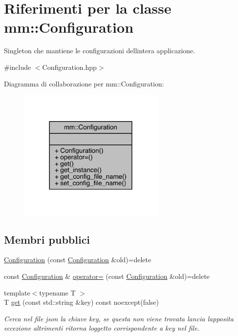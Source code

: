 \hypertarget{classmm_1_1_configuration}{}\section{Riferimenti per la classe mm\+:\+:Configuration}
\label{classmm_1_1_configuration}


Singleton che mantiene le configurazioni dell\textquotesingle{}intera applicazione.  




{\ttfamily \#include $<$Configuration.\+hpp$>$}



Diagramma di collaborazione per mm\+:\+:Configuration\+:\nopagebreak
\begin{figure}[H]
\begin{center}
\leavevmode
\includegraphics[width=206pt]{dc/d7c/classmm_1_1_configuration__coll__graph}
\end{center}
\end{figure}
\subsection*{Membri pubblici}
\begin{DoxyCompactItemize}
\item 
\hyperlink{classmm_1_1_configuration_a71e5c0e1ad7d82d6a14895a4e85d83b7}{Configuration} (const \hyperlink{classmm_1_1_configuration}{Configuration} \&old)=delete
\item 
const \hyperlink{classmm_1_1_configuration}{Configuration} \& \hyperlink{classmm_1_1_configuration_a3077aebf459758dce4be716a8ddcb090}{operator=} (const \hyperlink{classmm_1_1_configuration}{Configuration} \&old)=delete
\item 
{\footnotesize template$<$typename T $>$ }\\T \hyperlink{classmm_1_1_configuration_a30374c407050b9fb3f05dd3c2c01202d}{get} (const std\+::string \&key) const noexcept(false)
\begin{DoxyCompactList}\small\item\em Cerca nel file json la chiave {\ttfamily key}, se questa non viene trovata lancia l\textquotesingle{}apposita eccezione altrimenti ritorna l\textquotesingle{}oggetto corrispondente a {\ttfamily key} nel file. \end{DoxyCompactList}\end{DoxyCompactItemize}
